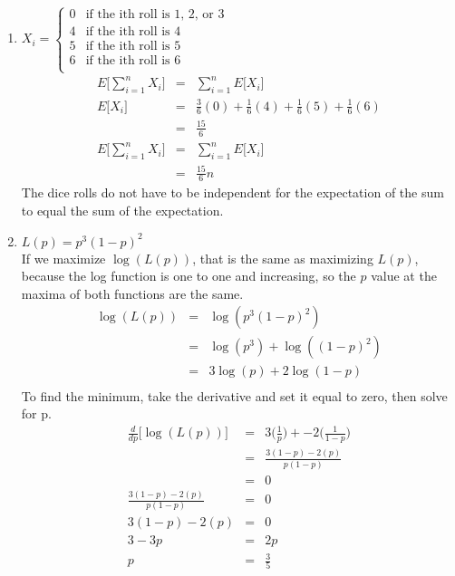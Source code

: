 \documentclass[12pt]{article}
\begin{document}
\begin{enumerate}[label=(\alph*)]
  \item
  $X_i = \left \{
     \begin{array}{ll}
       0 & \mbox{if the ith roll is 1, 2, or 3}\\
       4 & \mbox{if the ith roll is 4}\\
       5 & \mbox{if the ith roll is 5}\\
       6 & \mbox{if the ith roll is 6}\\
     \end{array}
   \right.
   $
  \begin{eqnarray*}
  E\biggl[\displaystyle\sum\limits_{i=1}^n X_i\biggr] &=& \displaystyle\sum\limits_{i=1}^n E\biggl[X_i\biggr]\\
  E\biggl[X_i\biggr] &=& \frac{3}{6} (0) + \frac{1}{6} (4) + \frac{1}{6} (5) + \frac{1}{6} (6) \\
  &=& \frac{15}{6}\\
  E\biggl[\displaystyle\sum\limits_{i=1}^n X_i\biggr] &=& \displaystyle\sum\limits_{i=1}^n E\biggl[X_i\biggr]\\
  &=& \frac{15}{6} n
  \end{eqnarray*}
  The dice rolls do not have to be independent for the expectation of the sum to equal the sum of the expectation.

  \item
  $L(p) = p^3(1-p)^2$\\
  If we maximize $\log(L(p))$, that is the same as maximizing $L(p)$, because the log function is one to one and increasing, so the $p$ value at the maxima of both functions are the same.
  \begin{eqnarray*}
  \log(L(p)) &=& \log(p^3(1-p)^2)\\
  &=& \log(p^3) + \log((1-p)^2)\\
  &=& 3\log(p) + 2\log(1-p)\\
  \end{eqnarray*}
  To find the minimum, take the derivative and set it equal to zero, then solve for p.
  \begin{eqnarray*}
  \frac{d}{dp}\biggl[\log(L(p))\biggr] &=& 3\biggl(\frac{1}{p}\biggr) + -2\biggl(\frac{1}{1-p}\biggr)\\
  &=& \frac{3(1-p) - 2(p)}{p(1-p)}\\
  &=& 0\\
  \frac{3(1-p) - 2(p)}{p(1-p)} &=& 0\\
  3(1-p) - 2(p) &=& 0\\
  3 - 3p &=& 2p\\
  p &=& \frac{3}{5}\\
  \end{eqnarray*}

\end{enumerate}
\end{document}
